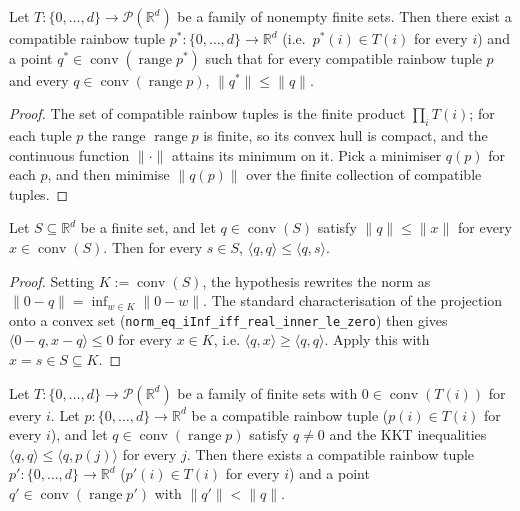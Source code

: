 \begin{lemma}
\label{lem:cc_min_simplex}
\leanok
Let \(T : \{0,\dots,d\} \to \mathcal{P}(\mathbb{R}^d)\) be a family of
nonempty finite sets. Then there exist a compatible rainbow tuple
\(p^{*} : \{0,\dots,d\} \to \mathbb{R}^d\) (i.e.\ \(p^{*}(i) \in T(i)\)
for every \(i\)) and a point
\(q^{*} \in \operatorname{conv}(\operatorname{range} p^{*})\) such that
for every compatible rainbow tuple \(p\) and every
\(q \in \operatorname{conv}(\operatorname{range} p)\),
\(\|q^{*}\| \le \|q\|\).
\end{lemma}

\begin{proof}
\leanok
The set of compatible rainbow tuples is the finite product
\(\prod_i T(i)\); for each tuple \(p\) the range
\(\operatorname{range} p\) is finite, so its convex hull is compact,
and the continuous function \(\|\cdot\|\) attains its minimum on it.
Pick a minimiser \(q(p)\) for each \(p\), and then minimise
\(\|q(p)\|\) over the finite collection of compatible tuples.
\end{proof}

\begin{lemma}
\label{lem:cc_kkt}
\leanok
Let \(S \subseteq \mathbb{R}^d\) be a finite set, and let
\(q \in \operatorname{conv}(S)\) satisfy \(\|q\| \le \|x\|\) for every
\(x \in \operatorname{conv}(S)\). Then for every \(s \in S\),
\(\langle q, q \rangle \le \langle q, s \rangle\).
\end{lemma}

\begin{proof}
\leanok
Setting \(K := \operatorname{conv}(S)\), the hypothesis rewrites the
norm as \(\|0 - q\| = \inf_{w \in K} \|0 - w\|\). The standard
characterisation of the projection onto a convex set
(\texttt{norm\_eq\_iInf\_iff\_real\_inner\_le\_zero}) then gives
\(\langle 0 - q, x - q \rangle \le 0\) for every \(x \in K\), i.e.
\(\langle q, x \rangle \ge \langle q, q \rangle\). Apply this with
\(x = s \in S \subseteq K\).
\end{proof}

\begin{lemma}
\label{lem:cc_replacement}
\leanok
Let \(T : \{0,\dots,d\} \to \mathcal{P}(\mathbb{R}^d)\) be a family of
finite sets with \(0 \in \operatorname{conv}(T(i))\) for every \(i\).
Let \(p : \{0,\dots,d\} \to \mathbb{R}^d\) be a compatible rainbow
tuple (\(p(i) \in T(i)\) for every \(i\)), and let
\(q \in \operatorname{conv}(\operatorname{range} p)\) satisfy
\(q \neq 0\) and the KKT inequalities
\(\langle q, q \rangle \le \langle q, p(j) \rangle\) for every \(j\).
Then there exists a compatible rainbow tuple
\(p' : \{0,\dots,d\} \to \mathbb{R}^d\) (\(p'(i) \in T(i)\) for every
\(i\)) and a point
\(q' \in \operatorname{conv}(\operatorname{range} p')\) with
\(\|q'\| < \|q\|\).
\end{lemma}

